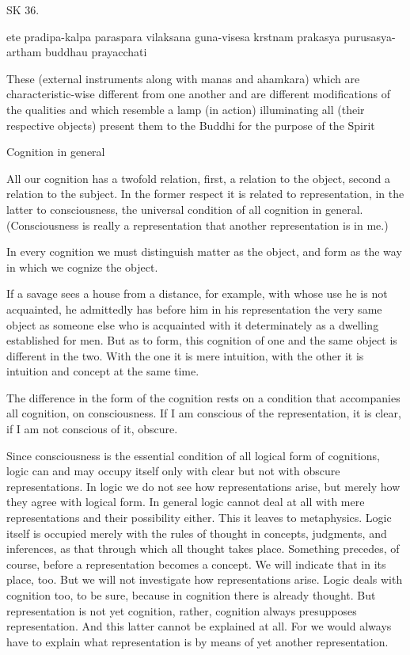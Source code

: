 SK 36.

ete pradipa-kalpa paraspara vilaksana guna-visesa
krstnam prakasya purusasya-artham buddhau prayacchati

These (external instruments along with manas and ahamkara)
which are characteristic-wise different from one another
and are different modifications of the qualities
and which resemble a lamp (in action)
illuminating all (their respective objects)
present them to the Buddhi for the purpose of the Spirit

Cognition in general

All our cognition has a twofold relation,
first, a relation to the object,
second a relation to the subject.
In the former respect it is related to representation,
in the latter to consciousness,
the universal condition of all cognition in general.
(Consciousness is really a representation
that another representation is in me.)

In every cognition we must distinguish matter as the object,
and form as the way in which we cognize the object.

    If a savage sees a house from a distance, for example,
    with whose use he is not acquainted, he admittedly
    has before him in his representation the very same object as
    someone else who is acquainted with it determinately
    as a dwelling established for men.
    But as to form, this cognition of one and the same object
    is different in the two.
    With the one it is mere intuition,
    with the other it is intuition and concept at the same time.

The difference in the form of the cognition rests on
a condition that accompanies all cognition, on consciousness.
If I am conscious of the representation, it is clear,
if I am not conscious of it, obscure.

    Since consciousness is the essential condition of
    all logical form of cognitions,
    logic can and may occupy itself only
    with clear but not with obscure representations.
    In logic we do not see how representations arise,
    but merely how they agree with logical form.
    In general logic cannot deal at all with
    mere representations and their possibility either.
    This it leaves to metaphysics.
    Logic itself is occupied merely with the rules of thought in
    concepts, judgments, and inferences,
    as that through which all thought takes place.
    Something precedes, of course, before a representation becomes a concept.
    We will indicate that in its place, too.
    But we will not investigate how representations arise.
    Logic deals with cognition too, to be sure,
    because in cognition there is already thought.
    But representation is not yet cognition, rather,
    cognition always presupposes representation.
    And this latter cannot be explained at all.
    For we would always have to explain what representation is
    by means of yet another representation.

